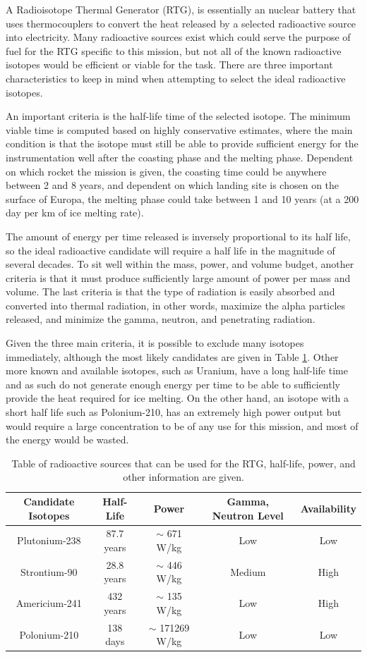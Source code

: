 A Radioisotope Thermal Generator (RTG), is essentially an nuclear battery that uses thermocouplers to convert the heat released by a selected radioactive source into electricity. Many radioactive sources exist which could serve the purpose of fuel for the RTG specific to this mission, but not all of the known radioactive isotopes would be efficient or viable for the task. There are three important characteristics to keep in mind when attempting to select the ideal radioactive isotopes.

An important criteria is the half-life time of the selected isotope. The minimum viable time is computed based on highly conservative estimates, where the main condition is that the isotope must still be able to provide sufficient energy for the instrumentation well after the coasting phase and the melting phase. Dependent on which rocket the mission is given, the coasting time could be anywhere between 2 and 8 years, and dependent on which landing site is chosen on the surface of Europa, the melting phase could take between 1 and 10 years (at a 200 day per km of ice melting rate). 

The amount of energy per time released is inversely proportional to its half life, so the ideal radioactive candidate will require a half life in the magnitude of several decades. To sit well within the mass, power, and volume budget, another criteria is that it must produce sufficiently large amount of power per mass and volume. The last criteria is that the type of radiation is easily absorbed and converted into thermal radiation, in other words, maximize the alpha particles released, and minimize the gamma, neutron, and penetrating radiation.

Given the three main criteria, it is possible to exclude many isotopes immediately, although the most likely candidates are given in Table \ref{tab:isotopes}. Other more known and available isotopes, such as Uranium, have a long half-life time and as such do not generate enough energy per time to be able to sufficiently provide the heat required for ice melting. On the other hand, an isotope with a short half life such as Polonium-210, has an extremely high power output but would require a large concentration to be of any use for this mission, and most of the energy would be wasted.

\begin{table}[h!]
	\begin{tabular}{c|c|c|c|c}
		Candidate Isotopes & Half-Life & Power & Gamma, Neutron Level & Availability\\
		\hline
		Plutonium-238 & 87.7 years & $\sim$ 671 W/kg & Low & Low\\
		Strontium-90 & 28.8 years & $\sim$ 446 W/kg & Medium & High\\
		Americium-241 & 432 years & $\sim$ 135 W/kg & Low & High\\
		Polonium-210 & 138 days & $\sim$ 171269 W/kg & Low & Low\\
	\end{tabular}
	\caption{Table of radioactive sources that can be used for the RTG, half-life, power, and other information are given. \label{tab:isotopes}}
\end{table}

